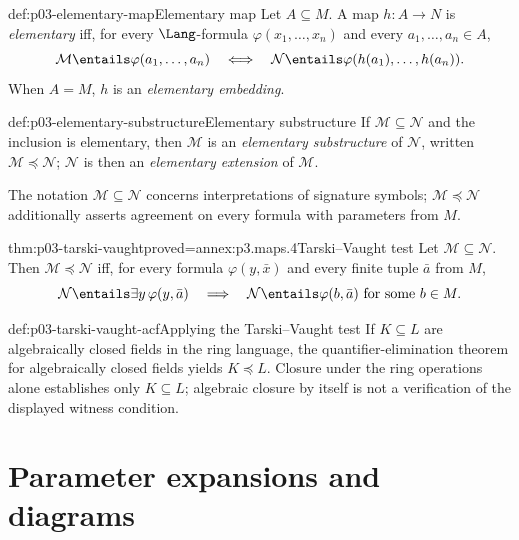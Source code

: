 \begin{hbdefinition}{def:p03-elementary-map}{Elementary map}
Let \(A\subseteq M\).  A map \(h:A\to N\) is \emph{elementary} iff, for every
\(\Lang\)-formula \(\varphi(x_1,\ldots,x_n)\) and every
\(a_1,\ldots,a_n\in A\),
\[
 \mathcal M\entails\varphi(a_1,\ldots,a_n)
 \quad\Longleftrightarrow\quad
 \mathcal N\entails\varphi(h(a_1),\ldots,h(a_n)).
\]
When \(A=M\), \(h\) is an \emph{elementary embedding}.
\end{hbdefinition}

\begin{hbdefinition}{def:p03-elementary-substructure}{Elementary substructure}
If \(\mathcal M\subseteq\mathcal N\) and the inclusion is elementary, then
\(\mathcal M\) is an \emph{elementary substructure} of \(\mathcal N\), written
\(\mathcal M\preccurlyeq\mathcal N\); \(\mathcal N\) is then an
\emph{elementary extension} of \(\mathcal M\).
\end{hbdefinition}

The notation \(\mathcal M\subseteq\mathcal N\) concerns interpretations of
signature symbols; \(\mathcal M\preccurlyeq\mathcal N\) additionally asserts
agreement on every formula with parameters from \(M\).

\begin{hbtheorem}{thm:p03-tarski-vaught}{proved=annex:p3.maps.4}{Tarski--Vaught test}
Let \(\mathcal M\subseteq\mathcal N\).  Then
\(\mathcal M\preccurlyeq\mathcal N\) iff, for every formula
\(\varphi(y,\bar x)\) and every finite tuple \(\bar a\) from \(M\),
\[
 \mathcal N\entails\exists y\,\varphi(y,\bar a)
 \quad\Longrightarrow\quad
 \mathcal N\entails\varphi(b,\bar a)
 \text{ for some }b\in M.
\]
\end{hbtheorem}

\begin{hbexample}{def:p03-tarski-vaught-acf}{Applying the Tarski--Vaught test}
If \(K\subseteq L\) are algebraically closed fields in the ring language, the
quantifier-elimination theorem for algebraically closed fields yields
\(K\preccurlyeq L\).  Closure under the ring operations alone establishes only
\(K\subseteq L\); algebraic closure by itself is not a verification of the
displayed witness condition.
\end{hbexample}

\section{Parameter expansions and diagrams}
\label{sec:p03-diagrams}

